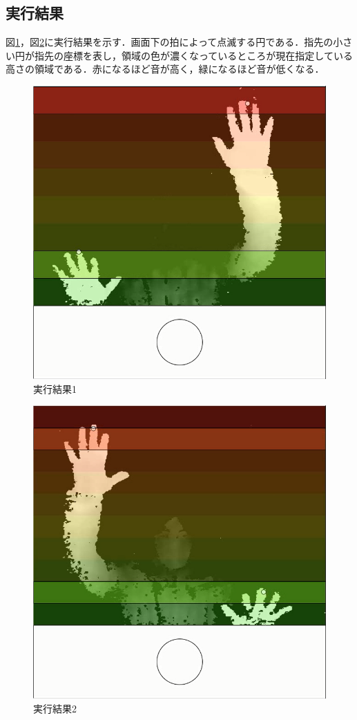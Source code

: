 \subsection{実行結果}
図\ref{img:interface_result1}，図\ref{img:interface_result3}に実行結果を示す．画面下の拍によって点滅する円である．指先の小さい円が指先の座標を表し，領域の色が濃くなっているところが現在指定している高さの領域である．赤になるほど音が高く，緑になるほど音が低くなる．
\begin{figure}[t]
	\begin{center}
		\includegraphics[width=0.5\linewidth]{./pics/03/result1.png}
		\caption{実行結果1}
		\label{img:interface_result1} 
	\end{center}
\end{figure}
\begin{figure}[t]
	\begin{center}
		\includegraphics[width=0.5\linewidth]{./pics/03/result3.png}
		\caption{実行結果2}
		\label{img:interface_result3} 
	\end{center}
\end{figure}
